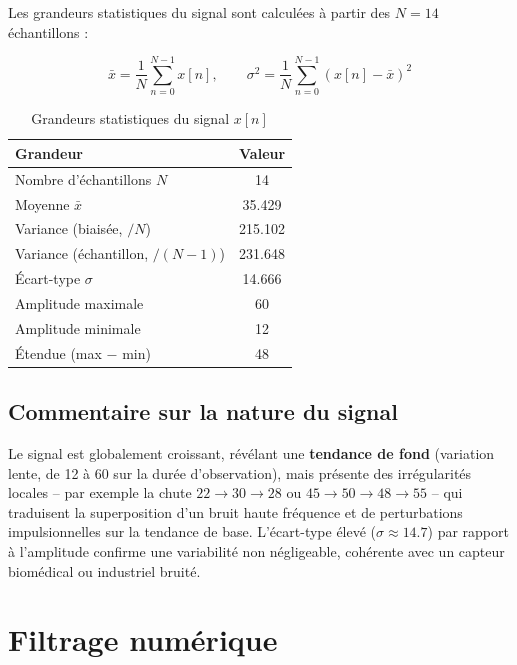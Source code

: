 \documentclass[11pt,a4paper]{article}
\begin{document}
Les grandeurs statistiques du signal sont calculées à partir des $N = 14$ échantillons :

\[
\bar{x} = \frac{1}{N}\sum_{n=0}^{N-1} x[n], \qquad
\sigma^2 = \frac{1}{N}\sum_{n=0}^{N-1} (x[n] - \bar{x})^2
\]

\begin{table}[H]
    \centering
    \caption{Grandeurs statistiques du signal $x[n]$}
    \label{tab:stats_A}
    \begin{tabular}{@{}lc@{}}
        \toprule
        \textbf{Grandeur} & \textbf{Valeur} \\
        \midrule
        Nombre d'échantillons $N$          & 14 \\
        Moyenne $\bar{x}$                   & 35.429 \\
        Variance (biaisée, $/N$)            & 215.102 \\
        Variance (échantillon, $/(N-1)$)    & 231.648 \\
        Écart-type $\sigma$                 & 14.666 \\
        Amplitude maximale                  & 60 \\
        Amplitude minimale                  & 12 \\
        Étendue (max $-$ min)                & 48 \\
        \bottomrule
    \end{tabular}
\end{table}

\subsection{Commentaire sur la nature du signal}

Le signal est globalement croissant, révélant une \textbf{tendance de fond} (variation lente, de 12 à 60 sur la durée d'observation), mais présente des irrégularités locales -- par exemple la chute $22 \rightarrow 30 \rightarrow 28$ ou $45 \rightarrow 50 \rightarrow 48 \rightarrow 55$ -- qui traduisent la superposition d'un bruit haute fréquence et de perturbations impulsionnelles sur la tendance de base. L'écart-type élevé ($\sigma \approx 14.7$) par rapport à l'amplitude confirme une variabilité non négligeable, cohérente avec un capteur biomédical ou industriel bruité.

\newpage
\section{Filtrage numérique}
\end{document}
